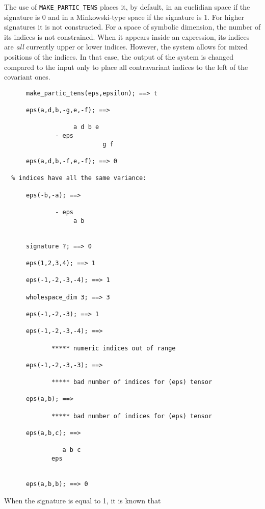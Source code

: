 The use of \texttt{MAKE\_PARTIC\_TENS} places it, by default, in an
euclidian space if the signature is 0 and in a Minkowski-type space if
the signature%
 is 1.
For higher signatures it is not constructed.
For a space of symbolic dimension, the number of its indices is not
constrained. When it appears inside an expression, its indices are \emph{all}
currently upper or lower indices. However, the system allows for
mixed positions of the indices. In that case, the output of the system
is changed compared to the input  only to place all contravariant indices
to the left of the covariant ones.
\begin{verbatim}
      make_partic_tens(eps,epsilon); ==> t

      eps(a,d,b,-g,e,-f); ==>

                   a d b e
              - eps
                           g f

      eps(a,d,b,-f,e,-f); ==> 0

  % indices have all the same variance:

      eps(-b,-a); ==>

              - eps
                   a b


      signature ?; ==> 0

      eps(1,2,3,4); ==> 1

      eps(-1,-2,-3,-4); ==> 1

      wholespace_dim 3; ==> 3

      eps(-1,-2,-3); ==> 1

      eps(-1,-2,-3,-4); ==>

             ***** numeric indices out of range

      eps(-1,-2,-3,-3); ==>

             ***** bad number of indices for (eps) tensor

      eps(a,b); ==>

             ***** bad number of indices for (eps) tensor

      eps(a,b,c); ==>

                a b c
             eps


      eps(a,b,b); ==> 0
\end{verbatim}
When the signature%
 is equal to 1, it is known that
